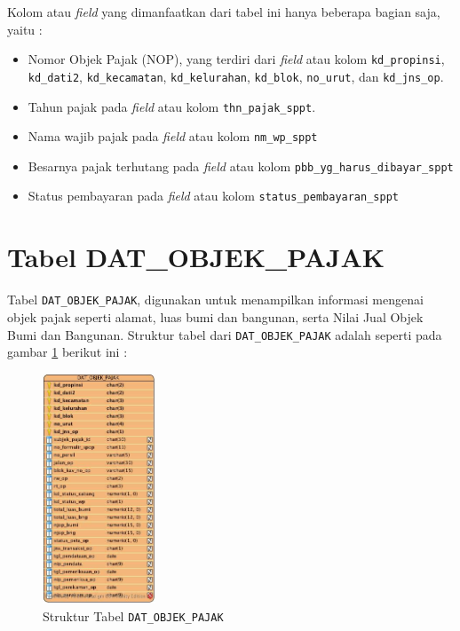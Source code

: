Kolom atau \textit{field} yang dimanfaatkan dari tabel ini hanya beberapa bagian saja, yaitu :

\begin{itemize}
	\item Nomor Objek Pajak (NOP), yang terdiri dari \textit{field} atau kolom \texttt{kd\_propinsi}, \texttt{kd\_dati2}, \texttt{kd\_kecamatan}, \texttt{kd\_kelurahan}, \texttt{kd\_blok}, \texttt{no\_urut}, dan \texttt{kd\_jns\_op}.
	\item Tahun pajak pada \textit{field} atau kolom \texttt{thn\_pajak\_sppt}.
	\item Nama wajib pajak pada \textit{field} atau kolom \texttt{nm\_wp\_sppt}
	\item Besarnya pajak terhutang pada \textit{field} atau kolom \texttt{pbb\_yg\_harus\_dibayar\_sppt}
	\item Status pembayaran pada \textit{field} atau kolom \texttt{status\_pembayaran\_sppt}
\end{itemize}

\section{Tabel DAT\_OBJEK\_PAJAK}

Tabel \texttt{DAT\_OBJEK\_PAJAK}, digunakan untuk menampilkan informasi mengenai objek pajak seperti alamat, luas bumi dan bangunan, serta Nilai Jual Objek Bumi dan Bangunan. Struktur tabel dari \texttt{DAT\_OBJEK\_PAJAK} adalah seperti pada gambar \ref{fig:tab-dat-op} berikut ini :

\begin{figure}[H]	
	\centering
	\includegraphics[width=0.3\textwidth]{./resources/struktur-tabel-dat-op}
	\caption{Struktur Tabel \texttt{DAT\_OBJEK\_PAJAK}}
	\label{fig:tab-dat-op}
\end{figure}

